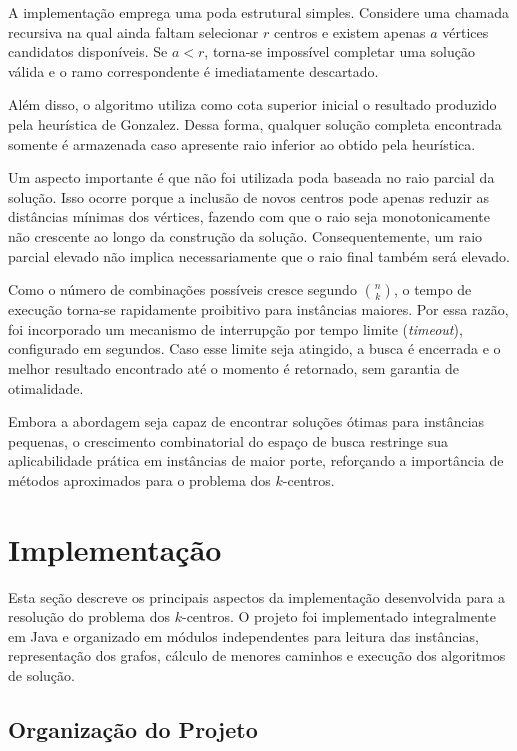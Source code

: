 \documentclass[12pt]{article}
\begin{document}
A implementação emprega uma poda estrutural simples. Considere uma chamada recursiva na qual ainda faltam selecionar $r$ centros e existem apenas $a$ vértices candidatos disponíveis. Se $a < r$, torna-se impossível completar uma solução válida e o ramo correspondente é imediatamente descartado.

Além disso, o algoritmo utiliza como cota superior inicial o resultado produzido pela heurística de Gonzalez. Dessa forma, qualquer solução completa encontrada somente é armazenada caso apresente raio inferior ao obtido pela heurística.

Um aspecto importante é que não foi utilizada poda baseada no raio parcial da solução. Isso ocorre porque a inclusão de novos centros pode apenas reduzir as distâncias mínimas dos vértices, fazendo com que o raio seja monotonicamente não crescente ao longo da construção da solução. Consequentemente, um raio parcial elevado não implica necessariamente que o raio final também será elevado.

Como o número de combinações possíveis cresce segundo $\binom{n}{k}$, o tempo de execução torna-se rapidamente proibitivo para instâncias maiores. Por essa razão, foi incorporado um mecanismo de interrupção por tempo limite (\textit{timeout}), configurado em segundos. Caso esse limite seja atingido, a busca é encerrada e o melhor resultado encontrado até o momento é retornado, sem garantia de otimalidade.

Embora a abordagem seja capaz de encontrar soluções ótimas para instâncias pequenas, o crescimento combinatorial do espaço de busca restringe sua aplicabilidade prática em instâncias de maior porte, reforçando a importância de métodos aproximados para o problema dos $k$-centros.

\section{Implementação}

Esta seção descreve os principais aspectos da implementação desenvolvida para a resolução do problema dos $k$-centros. O projeto foi implementado integralmente em Java e organizado em módulos independentes para leitura das instâncias, representação dos grafos, cálculo de menores caminhos e execução dos algoritmos de solução.

\subsection{Organização do Projeto}
\end{document}
